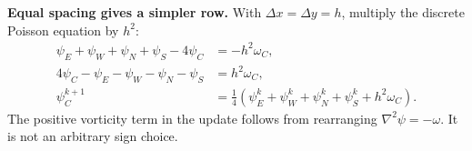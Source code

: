 \textbf{Equal spacing gives a simpler row.} With $\Delta x=\Delta y=h$, multiply the discrete Poisson equation by $h^2$:
\begin{align*}
\psi_E+\psi_W+\psi_N+\psi_S-4\psi_C&=-h^2\omega_C,\\
4\psi_C-\psi_E-\psi_W-\psi_N-\psi_S&=h^2\omega_C,\\
\psi_C^{k+1}&=\tfrac14(\psi_E^k+\psi_W^k+\psi_N^k+\psi_S^k+h^2\omega_C).
\end{align*}
The positive vorticity term in the update follows from rearranging $\nabla^2\psi=-\omega$. It is not an arbitrary sign choice.
\newpage

